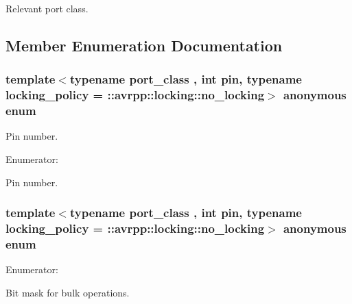 Relevant port class. 



\subsection{Member Enumeration Documentation}
\hypertarget{structavrpp_1_1ports_1_1output_a4af0fffcb7e47b6b2824e89588d6d97d}{
\subsubsection[{"@25}]{\setlength{\rightskip}{0pt plus 5cm}template$<$typename port\_\-class , int pin, typename locking\_\-policy  = ::avrpp::locking::no\_\-locking$>$ anonymous enum}}
\label{structavrpp_1_1ports_1_1output_a4af0fffcb7e47b6b2824e89588d6d97d}


Pin number. 

\begin{Desc}
\item[Enumerator: ]\par
\begin{description}
\item[{\em 
\hypertarget{structavrpp_1_1ports_1_1output_a4af0fffcb7e47b6b2824e89588d6d97da81563aa2dc6432e0198561d47ca3aa90}{
port\_\-pin}
\label{structavrpp_1_1ports_1_1output_a4af0fffcb7e47b6b2824e89588d6d97da81563aa2dc6432e0198561d47ca3aa90}
}]Pin number. \end{description}
\end{Desc}

\hypertarget{structavrpp_1_1ports_1_1output_a9ce0e6e31fbb19b66f32d187d3449897}{
\subsubsection[{"@26}]{\setlength{\rightskip}{0pt plus 5cm}template$<$typename port\_\-class , int pin, typename locking\_\-policy  = ::avrpp::locking::no\_\-locking$>$ anonymous enum}}
\label{structavrpp_1_1ports_1_1output_a9ce0e6e31fbb19b66f32d187d3449897}
\begin{Desc}
\item[Enumerator: ]\par
\begin{description}
\item[{\em 
\hypertarget{structavrpp_1_1ports_1_1output_a9ce0e6e31fbb19b66f32d187d3449897a91b03d6c0e61d15c8262f6e4ef097763}{
bulk\_\-mask}
\label{structavrpp_1_1ports_1_1output_a9ce0e6e31fbb19b66f32d187d3449897a91b03d6c0e61d15c8262f6e4ef097763}
}]Bit mask for bulk operations. \end{description}
\end{Desc}



